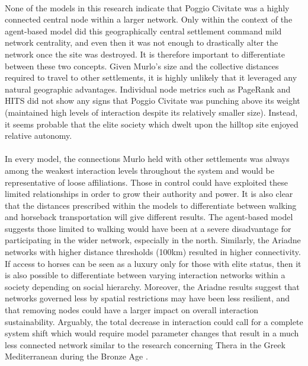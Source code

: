 \documentclass[12pt,a4paper]{thesis}
\begin{document}
\paragraph{}
None of the models in this research indicate that Poggio Civitate was a highly connected central node within a larger network. Only within the context of the agent-based model did this geographically central settlement command mild network centrality, and even then it was not enough to drastically alter the network once the site was destroyed. It is therefore important to differentiate between these two concepts. Given Murlo's size and the collective distances required to travel to other settlements, it is highly unlikely that it leveraged any natural geographic advantages. Individual node metrics such as PageRank and HITS did not show any signs that Poggio Civitate was punching above its weight (maintained high levels of interaction despite its relatively smaller size). Instead, it seems probable that the elite society which dwelt upon the hilltop site enjoyed relative autonomy. 
\paragraph{}
In every model, the connections Murlo held with other settlements was always among the weakest interaction levels throughout the system and would be representative of loose affiliations. Those in control could have exploited these limited relationships in order to grow their authority and power. It is also clear that the distances prescribed within the models to differentiate between walking and horseback transportation will give different results. The agent-based model suggests those limited to walking would have been at a severe disadvantage for participating in the wider network, especially in the north. Similarly, the Ariadne networks with higher distance thresholds (100km) resulted in higher connectivity. If access to horses can be seen as a luxury only for those with elite status, then it is also possible to differentiate between varying interaction networks within a society depending on social hierarchy. Moreover, the Ariadne results suggest that networks governed less by spatial restrictions may have been less resilient, and that removing nodes could have a larger impact on overall interaction sustainability. Arguably, the total decrease in interaction could call for a complete system shift which would require model parameter changes that result in a much less connected network similar to the research concerning Thera in the Greek Mediterranean during the Bronze Age \citep{KnaRivEva11}.      
\end{document}
